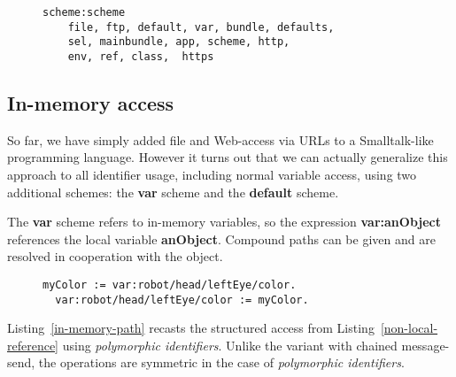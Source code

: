 \documentclass[preprint,authoryear]{acm_proc_article-sp}
\begin{document}
\begin{figure}[htbp]
\begin{lstlisting}[style=L,label=scheme-scheme,caption=List of schemes via scheme:scheme.]
  scheme:scheme
    file, ftp, default, var, bundle, defaults, 
    sel, mainbundle, app, scheme, http,
    env, ref, class,  https
\end{lstlisting}
\end{figure}

\subsection{In-memory access}


So far, we have simply added file and Web-access via URLs to a 
Smalltalk-like programming language.  However it turns out that we can actually generalize
this approach to all identifier usage, including normal variable access, using
two additional schemes:  the {\bf var} scheme and the {\bf default} scheme.

The {\bf var} scheme refers to in-memory variables, so the expression
 {\bf var:anObject} references the
local variable {\bf anObject}.   Compound paths can be given and are resolved in
cooperation with the object.


\begin{figure}[htbp]
\begin{lstlisting}[style=L,label=in-memory-path,caption=In-memory access path.]
  myColor := var:robot/head/leftEye/color.
  var:robot/head/leftEye/color := myColor.
\end{lstlisting}
\end{figure}

Listing~\ref{in-memory-path} recasts the structured access from 
Listing~\ref{non-local-reference} using \emph{polymorphic identifiers}.  Unlike the variant
with chained message-send, the operations are symmetric in the case of \emph{polymorphic identifiers}.
\end{document}
